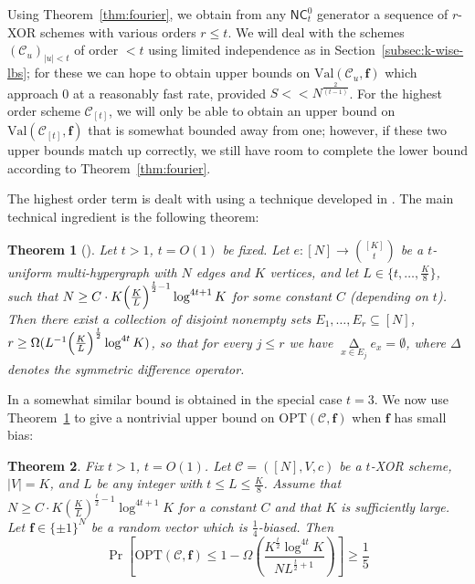 \documentclass[11pt]{article}
\newtheorem{theorem}{Theorem}
\newcommand{\Opt}{\mathrm{OPT}}
\newcommand{\N}{[N]}
\begin{document}
Using Theorem~\ref{thm:fourier}, we obtain from any $\mathsf{NC}^0_t$ generator a sequence of $r$-XOR schemes with various orders $r \leq t$. We will deal with the schemes $(\mathcal{C}_u)_{ |u|<t}$ of order $<t$ using limited independence as in Section~\ref{subsec:k-wise-lbs}; for these we can hope to obtain upper bounds on $\mathrm{Val}(\mathcal{C}_u,\bm{f})$ which approach 0 at a reasonably fast rate, provided $S << N^{\frac{2}{(t-1)}}$. For the highest order scheme $\mathcal{C}_{[t]}$, we will only be able to obtain an upper bound on $\mathrm{Val}(\mathcal{C}_{[t]},\bm{f})$ that is somewhat bounded away from one; however, if these two upper bounds match up correctly, we still have room to complete the lower bound according to Theorem~\ref{thm:fourier}.

The highest order term is dealt with using a technique developed in \cite{FKO,smoothed}. The main technical ingredient is the following theorem:
\begin{theorem}[\cite{smoothed}]\label{thm:moore}
Let $t > 1$, $t = O(1)$ be fixed. Let $e: [N] \to \binom{[K]}{t}$ be a $t$-uniform multi-hypergraph with $N$ edges and $K$ vertices, and let $L \in \{t,\ldots, \frac{K}{8}\}$, such that $N \geq C \cdot  K \Bigl(\frac{K}{L}\Bigr)^{\frac{t}{2}-1} \log^{4t + 1} K$ for some constant $C$ (depending on $t$). Then there exist a collection of disjoint nonempty sets $E_1,\ldots, E_r \subseteq [N]$, $r \geq \Omega(L^{-1} \Bigl(\frac{K}{L}\Bigr)^{\frac{t}{2}} \log^{4t} K)$, so that for every $j \leq r$ we have $\mathop{\Delta}\limits_{x \in E_j} e_x = \emptyset$, where $\Delta$ denotes the symmetric difference operator.
\end{theorem}
In \cite{FKO} a somewhat similar bound is obtained in the special case $t=3$.
We now use Theorem~\ref{thm:moore} to give a nontrivial upper bound on $\Opt(\mathcal{C},\bm{f})$ when $\bm{f}$ has small bias:
\begin{theorem}\label{thm:biased-val}
Fix $t > 1$, $t = O(1)$. Let $\mathcal{C} = (\N,V,c)$ be a $t$-XOR scheme, $|V|=K$, and $L$ be any integer with $t \leq L \leq \frac{K}{8}$. Assume that $N \geq C \cdot   K (\frac{K}{L})^{\frac{t}{2} - 1} \log^{4t +1} K$ for a constant $C$ and that $K$ is sufficiently large. Let $\bm{f}\in  \{\pm 1\}^N$ be a random vector which is $\frac{1}{4}$-biased. Then
\[
\Pr[ \Opt(\mathcal{C},\bm{f}) \leq 1-\Omega(\frac{K^{\frac{t}{2}}\log^{4t}K}{N L^{\frac{t}{2}+1}})] \geq \frac{1}{5}
\]

\end{theorem}
\end{document}
